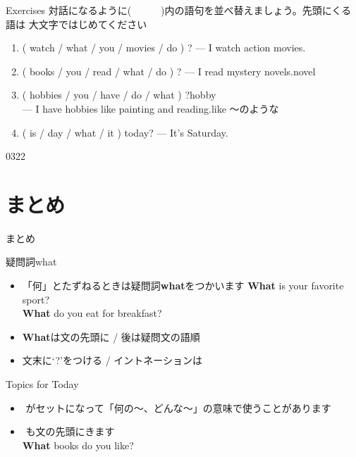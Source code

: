 \documentclass[aspectratio=169,xcolor={dvipsnames,table}]{beamer}
\begin{document}
\begin{frame}[plain]{Exercises}
 対話になるように(~~~~~~)内の語句を並べ替えましょう。先頭にくる語は
大文字ではじめてください
\begin{enumerate}
 \item ( watch / what / you / movies / do ) ? --- I watch action movies.\\
 \item ( books / you / read / what / do ) ? --- I read mystery novels.\hfill{\scriptsize novel }\\
 \item ( hobbies / you / have / do / what ) ?\hfill{}{\scriptsize hobby }\\
\mbox{}\hfill{}--- I have hobbies like painting and reading.\hfill{}{\scriptsize like 〜のような}\\
 \item ( is / day / what / it )  today? --- It's Saturday.\\
\hfill{}
\end{enumerate}

\mbox{}\hfill{\tiny 0322}\,{\scriptsize {}}

\end{frame}
\section{まとめ}
\begin{frame}[plain]{まとめ}

\begin{block}{疑問詞what }
\begin{itemize}[square]\small
 \item \<「何」とたずねるときは疑問詞\textbf{what}をつかいます%
\hfill{\scriptsize \textbf{What} is your favorite sport?}\\
\hfill{\scriptsize \textbf{What} do you eat for breakfast?}
 \item \textbf{What}は文の先頭に / 後は疑問文の語順
 \item   文末に`?'をつける / イントネーションは\myDownwardPitch{}
\end{itemize}
     \end{block}

\begin{block}{Topics for Today}
\begin{itemize}[square]\small
 \item {}\,\,がセットになって「何の〜、どんな～」の意味で使うことがあります
 \item {}\,\,も文の先頭にきます\\
\hfill{\scriptsize \textbf{What} books do you like?}
\end{itemize}
     \end{block}
\end{frame}
\end{document}
